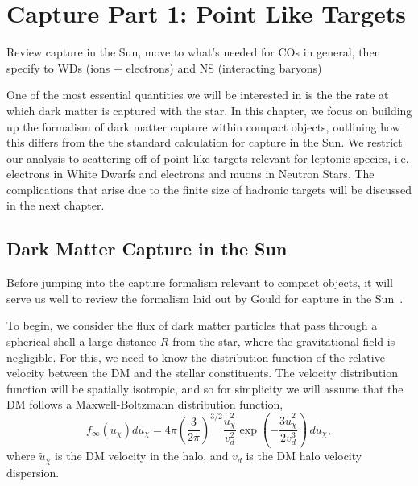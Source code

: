 \graphicspath{{img/chapter_2/}}

\chapter{Capture Part 1: Point Like Targets}
\label{chapter:capture_1}

\begin{synopsis}
Review capture in the Sun, move to what's needed for COs in general, then specify to WDs (ions + electrons) and NS (interacting baryons)
\end{synopsis}

One of the most essential quantities we will be interested in is the 
the rate at which dark matter is captured with the star. 
In this chapter, we focus on building up the formalism of dark matter 
capture within compact objects, outlining how this differs from the 
the standard calculation for capture in the Sun. We restrict our analysis to 
scattering off of point-like targets relevant for leptonic species, 
i.e. electrons in White Dwarfs and electrons and muons in Neutron Stars.
The complications that arise due to the finite size of hadronic targets 
will be discussed in the next chapter.



\section{Dark Matter Capture in the Sun}

Before jumping into the capture formalism relevant to compact objects, it will serve us well to review the formalism laid out by Gould for capture in the Sun~\cite{Gould:1987ju_WeaklyInteractingMassive, Gould:1987ir_ResonantEnhancementsWIMP}. 

To begin, we consider the flux of dark matter particles that pass through a spherical shell a large distance $R$ from the star, where the gravitational field is negligible. For this, we need to know the distribution function of the relative velocity between the DM and the stellar constituents. 
The velocity distribution function will be spatially isotropic, and so for simplicity we will assume that the DM follows a Maxwell-Boltzmann distribution function, 
\begin{equation}
    f_\infty(\tilde{u}_\chi) d\tilde{u}_\chi= 4 \pi \left( \frac{3}{2 \pi} \right)^{3/2}\frac{\tilde{u}_\chi^2}{v_d^2} \exp\left(-\frac{3 \tilde u_\chi^2}{2 v_d^3}\right)\,d\tilde u_\chi, 
\end{equation}
where $\tilde u_\chi$ is the DM velocity in the halo, and $v_d$ is the DM halo velocity dispersion.

